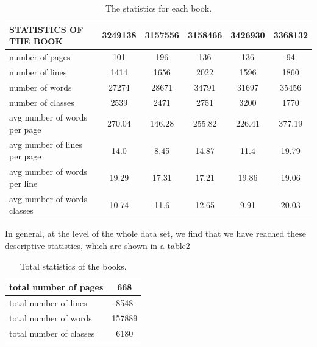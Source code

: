 \begin{table}[!htb]
\centering
\begin{tabular}{|l|c|c|c|c|c|}
\hline
STATISTICS OF THE BOOK & 3249138 & 3157556 & 3158466 & 3426930 & 3368132 \\  \hline
number of pages & 101 & 196 & 136 & 136 & 94 \\ \hline 
number of lines &  1414  & 1656 & 2022 & 1596 & 1860 \\ \hline 
number of words & 27274  & 28671 & 34791 & 31697 & 35456 \\ \hline 
number of classes & 2539 & 2471 & 2751 & 3200 & 1770 \\  \hline 
avg number of words per page & 270.04 & 146.28 & 255.82 & 226.41 & 377.19 \\ \hline 
avg number of lines per page & 14.0 & 8.45 & 14.87 & 11.4 & 19.79 \\ \hline 
avg number of words per line & 19.29 & 17.31 & 17.21 & 19.86 & 19.06 \\\hline 
avg number of words classes & 10.74 & 11.6 & 12.65 & 9.91 & 20.03\\  \hline 
\end{tabular}
\caption{The statistics for each book.}
\label{table:statistics_for_each_book}
\end{table}

In general, at the level of the whole data set, we find that we have reached these descriptive statistics, which are shown in a table\ref{table:statistics_for_all_dataset}

\begin{table}[!htb]
\centering
\begin{tabular}{|l|c|}
\hline
total number of pages & 668 \\ \hline
total number of lines & 8548 \\ \hline
total number of words & 157889 \\ \hline
total number of classes & 6180 \\ \hline
\end{tabular}
\caption{Total statistics of the books.}
\label{table:statistics_for_all_dataset}
\end{table}

